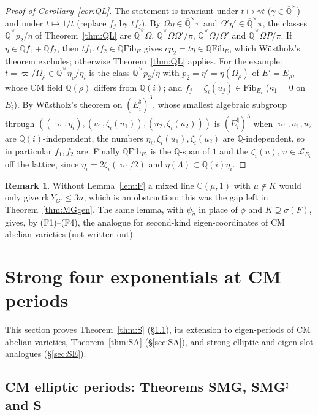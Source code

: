 \documentclass[11pt]{amsart}
\theoremstyle{definition}
\newtheorem{remark}[theorem]{Remark}
\newcommand{\Qb}{\overline{\mathbb{Q}}}
\newcommand{\C}{\mathbb{C}}
\newcommand{\Q}{\mathbb{Q}}
\newcommand{\Lg}{\mathcal{L}}
\newcommand{\vp}{\varpi}
\newcommand{\Fib}{\mathrm{Fib}}
\begin{document}
\begin{proof}[Proof of Corollary~\ref{cor:QL}]
The statement is invariant under $t\mapsto\gamma t$ ($\gamma\in\Qb^\times$) and under $t\mapsto1/t$ (replace $f_j$ by
$tf_j$). By $\Omega\eta\in\Qb^\times\pi$ and $\Omega'\eta'\in\Qb^\times\pi$, the classes $\Qb^\times p_2/\eta$ of
Theorem~\ref{thm:QL} are $\Qb^\times\Omega$, $\Qb^\times\Omega\Omega'/\pi$, $\Qb^\times\Omega/\Omega'$ and
$\Qb^\times\Omega P/\pi$. If $\eta\in\Qb f_1+\Qb f_2$, then $tf_1,tf_2\in\Qb\Fib_E$ gives $cp_2=t\eta\in\Qb\Fib_E$, which
W\"ustholz's theorem \cite{Wu89} excludes; otherwise Theorem~\ref{thm:QL} applies. For the example:
$t=\vp/\Omega_\rho\in\Qb^\times\eta_\rho/\eta_i$ is the class $\Qb^\times p_2/\eta$ with $p_2=\eta'=\eta(\Omega_\rho)$ of
$E'=E_\rho$, whose CM field $\Q(\rho)$ differs from $\Q(i)$; and $f_j=\zeta_i(u_j)\in\Fib_{E_i}$ ($\kappa_1=0$ on $E_i$).
By W\"ustholz's theorem on $(E_i^\natural)^3$, whose smallest algebraic subgroup through
$((\vp,\eta_i),(u_1,\zeta_i(u_1)),(u_2,\zeta_i(u_2)))$ is $(E_i^\natural)^3$ when $\vp,u_1,u_2$ are $\Q(i)$-independent,
the numbers $\eta_i,\zeta_i(u_1),\zeta_i(u_2)$ are $\Qb$-independent, so in particular $f_1,f_2$ are. Finally
$\Qb\Fib_{E_i}$ is the $\Qb$-span of $1$ and the $\zeta_i(u)$, $u\in\Lg_{E_i}$ off the lattice, since
$\eta_i=2\zeta_i(\vp/2)$ and $\eta(\Lambda)\subset\Q(i)\eta_i$.
\end{proof}

\begin{remark}
Without Lemma~\ref{lem:F} a mixed line $\C(\mu,1)$ with $\mu\notin K$ would only give $\mathrm{rk}\,Y_{G'}\le3n$, which is
an obstruction; this was the gap left in Theorem~\ref{thm:MGgen}. The same lemma, with $\psi_{\tilde\sigma}$ in place of
$\phi$ and $K\supseteq\tilde\sigma(F)$, gives, by (F1)--(F4), the analogue for second-kind eigen-coordinates of CM
abelian varieties (not written out).
\end{remark}

\section{Strong four exponentials at CM periods}\label{sec:S}
This section proves Theorem~\ref{thm:S} (\S\ref{sec:Sell}), its extension to eigen-periods of CM abelian varieties,
Theorem~\ref{thm:SA} (\S\ref{sec:SA}), and strong elliptic and eigen-slot analogues (\S\ref{sec:SE}).

\subsection{CM elliptic periods: Theorems SMG, SMG$^\natural$ and S}\label{sec:Sell}
\end{document}

